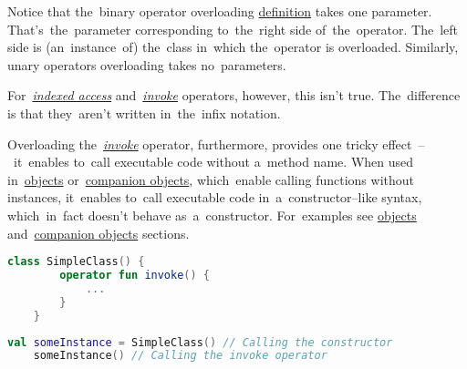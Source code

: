 \noindent Notice that the~binary operator overloading \hyperref[declarationdefinition]{definition} takes one parameter.
That's~the~parameter corresponding to~the~right side of~the~operator.
The~left side is (an~instance~of) the~class in~which the~operator is overloaded.
Similarly, unary operators overloading takes no~parameters.

For~\hyperref[kotlinindexedaccess]{\textit{indexed access}} \mbox{and \hyperref[kotlininvoke]{\textit{invoke}}} operators, however, this isn't true.
The~difference is that they~aren't written in~the~infix notation.

\label{kotlininvokeoverload}
Overloading the~\hyperref[kotlininvoke]{\textit{invoke}} operator, furthermore, provides one tricky effect~--~it~enables to~call executable code without a~method name.
When used in~\hyperref[kotlinobject]{objects} or~\hyperref[kotlincompanionobject]{companion objects}, which~enable calling functions without instances, it~enables to~call executable code in~a~constructor--like syntax, which~in~fact doesn't behave as~a~constructor.
For~examples see \hyperref[kotlinobject]{objects} and~\hyperref[kotlincompanionobject]{companion objects} sections.

\begin{lstlisting}[language=Kotlin, title={Custom class with \textit{invoke} operator overloading}]
    class SimpleClass() {
        operator fun invoke() {
            ...
        }
    }
\end{lstlisting}
\begin{lstlisting}[language=Kotlin, title={Usage -- no conflict with constructor}]
    val someInstance = SimpleClass() // Calling the constructor
    someInstance() // Calling the invoke operator
\end{lstlisting}
